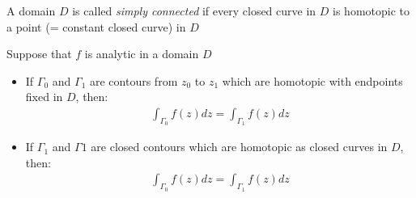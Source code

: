 \begin{theo}{}
  A domain $D$ is called \textit{simply connected}  if every closed curve in $D$ is homotopic to a point (= constant closed curve) in $D$
\end{theo}
\par\bigskip
\begin{theo}{}
  Suppose that $f$ is analytic in a domain $D$\par
  \begin{itemize}
    \item If $\Gamma_0$ and $\Gamma_1$ are contours from $z_0$ to $z_1$ which are homotopic with endpoints fixed in $D$, then:
      \begin{equation*}
        \begin{gathered}
          \int_{\Gamma_0}f(z)dz = \int_{\Gamma_1}f(z)dz
        \end{gathered}
      \end{equation*}
      \par\bigskip
    \item If $\Gamma_1$ and $\Gamma1$ are closed contours which are homotopic as closed curves in $D$, then:
      \begin{equation*}
        \begin{gathered}
          \int_{\Gamma_0}f(z)dz = \int_{\Gamma_1}f(z)dz
        \end{gathered}
      \end{equation*}
  \end{itemize}
\end{theo}
